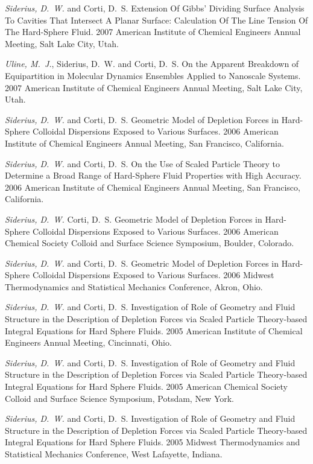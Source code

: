 {\it Siderius, D.~W.} and Corti, D.~S. Extension Of Gibbs' Dividing Surface Analysis To Cavities That Intersect A Planar Surface: Calculation Of The Line Tension Of The Hard-Sphere Fluid. 2007 American Institute of Chemical Engineers Annual Meeting, Salt Lake City, Utah.

{\it Uline, M.~J.}, Siderius, D.~W. and Corti, D.~S. On the Apparent Breakdown of Equipartition in Molecular Dynamics Ensembles Applied to Nanoscale Systems. 2007 American Institute of Chemical Engineers Annual Meeting, Salt Lake City, Utah.

{\it Siderius, D.~W.} and Corti, D.~S. Geometric Model of Depletion Forces in Hard-Sphere Colloidal Dispersions Exposed to Various Surfaces. 2006 American Institute of Chemical Engineers Annual Meeting, San Francisco, California.

{\it Siderius, D.~W.} and Corti, D.~S. On the Use of Scaled Particle Theory to Determine a Broad Range of Hard-Sphere Fluid Properties with High Accuracy. 2006 American Institute of Chemical Engineers Annual Meeting, San Francisco, California.

{\it Siderius, D.~W.} Corti, D.~S. Geometric Model of Depletion Forces in Hard-Sphere Colloidal Dispersions Exposed to Various Surfaces. 2006 American Chemical Society Colloid and Surface Science Symposium, Boulder, Colorado.

{\it Siderius, D.~W.} and Corti, D.~S. Geometric Model of Depletion Forces in Hard-Sphere Colloidal Dispersions Exposed to Various Surfaces. 2006 Midwest Thermodynamics and Statistical Mechanics Conference, Akron, Ohio.

{\it Siderius, D.~W.} and Corti, D.~S. Investigation of Role of Geometry and Fluid Structure in the Description of Depletion Forces via Scaled Particle Theory-based Integral Equations for Hard Sphere Fluids. 2005 American Institute of Chemical Engineers Annual Meeting, Cincinnati, Ohio.

{\it Siderius, D.~W.} and Corti, D.~S. Investigation of Role of Geometry and Fluid Structure in the Description of Depletion Forces via Scaled Particle Theory-based Integral Equations for Hard Sphere Fluids. 2005 American Chemical Society Colloid and Surface Science Symposium, Potsdam, New York.

{\it Siderius, D.~W.} and Corti, D.~S. Investigation of Role of Geometry and Fluid Structure in the Description of Depletion Forces via Scaled Particle Theory-based Integral Equations for Hard Sphere Fluids. 2005 Midwest Thermodynamics and Statistical Mechanics Conference, West Lafayette, Indiana.

